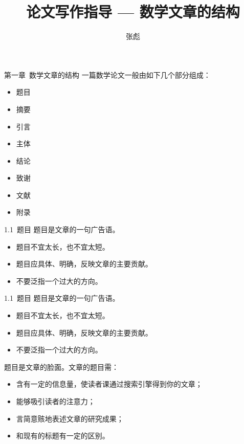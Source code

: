 \documentclass[13pt]{ctexbeamer}
\begin{document}
\title[]{论文写作指导 --- 数学文章的结构}
\author[]{{\large 张彪} }

\date{}


%



\begin{frame}
\maketitle
\end{frame}


	
\begin{frame}{第一章~数学文章的结构}
一篇数学论文一般由如下几个部分组成：
\begin{itemize}
\item {题目}
\item 摘要
\item 引言
\item 主体
\item 结论
\item 致谢
\item 文献
\item 附录
\end{itemize}


\end{frame}

\begin{frame}{1.1~题目}
题目是文章的一句广告语。
\begin{itemize}
	\item 题目不宜太长，也不宜太短。
	\item 题目应具体、明确，反映文章的主要贡献。
	\item 不要泛指一个过大的方向。
\end{itemize}
\end{frame}


\begin{frame}{1.1~题目}
	题目是文章的一句广告语。
	\begin{itemize}
		\item 题目不宜太长，也不宜太短。
		\item 题目应具体、明确，反映文章的主要贡献。
		\item 不要泛指一个过大的方向。
	\end{itemize}

题目是文章的脸面。文章的题目需：
\begin{itemize}
	\item 含有一定的信息量，使读者课通过搜索引擎得到你的文章；
	\item 能够吸引读者的注意力；
	\item  言简意赅地表述文章的研究成果；
	\item 和现有的标题有一定的区别。
\end{itemize}
\end{frame}
\end{document}
